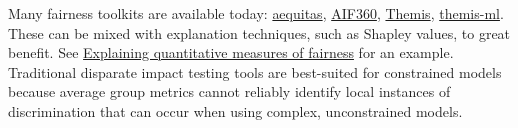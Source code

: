 \documentclass[11pt,aspectratio=169,hyperref={colorlinks}]{beamer}
\begin{document}
\begin{frame}
\begin{columns}

		
				Many fairness toolkits are available today: \href{https://github.com/dssg/aequitas}{aequitas}, \href{https://github.com/IBM/AIF360}{AIF360}, \href{https://github.com/LASER-UMASS/Themis}{Themis}, \href{https://github.com/cosmicBboy/themis-ml}{themis-ml}.\\
				\vspace{5pt}
				These can be mixed with explanation techniques, such as Shapley values, to great benefit. See  \href{https://bit.ly/2R3dXlu}{
					Explaining quantitative measures of fairness} for an example. 
				\\
				\vspace{5pt}
				Traditional disparate impact testing tools are best-suited for constrained models because average group metrics cannot reliably identify local instances of discrimination that can occur when using complex, unconstrained models.   
				
			\end{columns}
	
	\end{frame}
\end{document}
